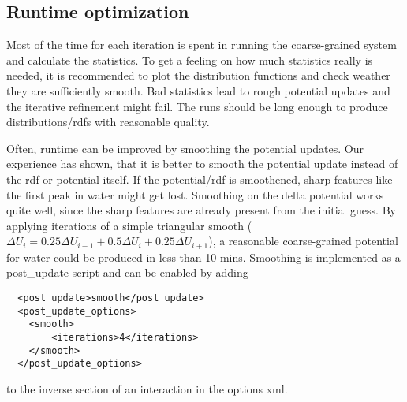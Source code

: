 \subsection{Runtime optimization}
Most of the time for each iteration is spent in running the coarse-grained system and calculate the statistics. To get a feeling on how much statistics really is needed, it is recommended to plot the distribution functions and check weather they are sufficiently smooth. Bad statistics lead to rough potential updates and the iterative refinement might fail. The runs should be long enough to produce distributions/rdfs with reasonable quality.

Often, runtime can be improved by smoothing the potential updates. Our experience has shown, that it is better to smooth the potential update instead of the rdf or potential itself. If the potential/rdf is smoothened, sharp features like the first peak in \spce water might get lost. Smoothing on the delta potential works quite well, since the sharp features are already present from the initial guess. By applying iterations of a simple triangular smooth ($ \Delta U_i = 0.25 \Delta U_{i-1} + 0.5\Delta U_i + 0.25\Delta U_{i+1} $), a reasonable coarse-grained potential for \spce water could be produced in less than 10 mins. Smoothing is implemented as a post\_update script and can be enabled by adding
\begin{verbatim}
  <post_update>smooth</post_update>
  <post_update_options>
    <smooth>
        <iterations>4</iterations>
    </smooth>
  </post_update_options>
\end{verbatim}
to the inverse section of an interaction in the options xml.




